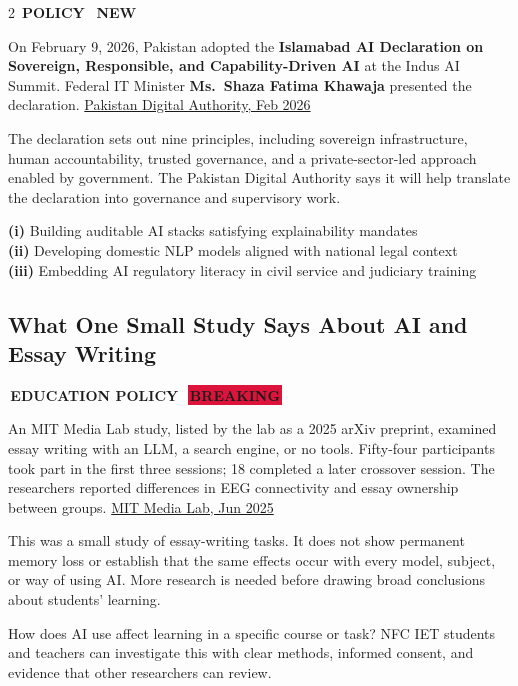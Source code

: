 \documentclass[10pt, a4paper]{article}
\newcommand{\sectiontag}[1]{%
  \noindent\colorbox{cobalt}{%
    \,\footnotesize\bfseries\color{white}\MakeUppercase{#1}\,}\,%
}
\newcommand{\hottag}{%
  \colorbox{crimson}{\,\scriptsize\bfseries\color{white}BREAKING\,}\ %
}
\newcommand{\newtag}{%
  \colorbox{emerald}{\,\scriptsize\bfseries\color{white}NEW\,}\ %
}
\begin{document}
\begin{multicols}{2}
\sectiontag{Policy}\quad\newtag

\medskip
{\small
On February 9, 2026, Pakistan adopted the \textbf{Islamabad AI Declaration on Sovereign, Responsible, and Capability-Driven AI} at the Indus AI Summit. Federal IT Minister \textbf{Ms.\ Shaza Fatima Khawaja} presented the declaration.
\href{https://www.pda.gov.pk/press-details.php?id=islamabad-ai-declaration}{Pakistan Digital Authority, Feb 2026}

The declaration sets out nine principles, including sovereign infrastructure, human accountability, trusted governance, and a private-sector-led approach enabled by government. The Pakistan Digital Authority says it will help translate the declaration into governance and supervisory work.
}

\begin{alertbox}[title={\faBalanceScale\quad Three Governance Gaps to Close}]
  {\small
  \textbf{(i)} Building auditable AI stacks satisfying explainability mandates\\
  \textbf{(ii)} Developing domestic NLP models aligned with national legal context\\
  \textbf{(iii)} Embedding AI regulatory literacy in civil service and judiciary training
  }
\end{alertbox}


\subsection{What One Small Study Says About AI and Essay Writing}

\sectiontag{Education Policy}\quad\hottag

\medskip
{\small
An MIT Media Lab study, listed by the lab as a 2025 arXiv preprint, examined essay writing with an LLM, a search engine, or no tools. Fifty-four participants took part in the first three sessions; 18 completed a later crossover session. The researchers reported differences in EEG connectivity and essay ownership between groups.
\href{https://www-prod.media.mit.edu/publications/your-brain-on-chatgpt/}{MIT Media Lab, Jun 2025}

This was a small study of essay-writing tasks. It does not show permanent memory loss or establish that the same effects occur with every model, subject, or way of using AI. More research is needed before drawing broad conclusions about students' learning.
}

\begin{insightbox}[title={\faGraduationCap\quad Research Opportunity}]
  {\small
  How does AI use affect learning in a specific course or task?
  NFC IET students and teachers can investigate this with clear methods,
  informed consent, and evidence that other researchers can review.
  }
\end{insightbox}


\end{multicols}
\end{document}
